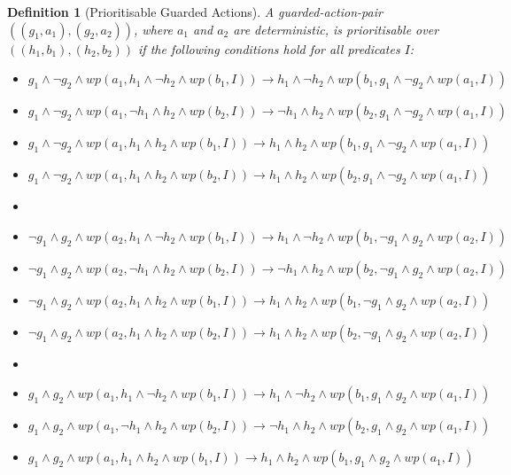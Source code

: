 \documentclass[11pt]{article}
\newtheorem{definition}{Definition}
\begin{document}
\begin{definition}[Prioritisable Guarded Actions]
A guarded-action-pair $((g_1,a_1),(g_2,a_2))$, where $a_1$ and $a_2$ are deterministic, is prioritisable over $((h_1,b_1),(h_2,b_2))$ if the following conditions hold for all predicates $I$:

\begin{itemize}
  \item $g_1 \land \lnot g_2 \land wp(a_1,h_1 \land \lnot h_2 \land wp(b_1,I)) \longrightarrow h_1 \land \lnot h_2 \land wp(b_1,g_1 \land \lnot g_2 \land wp(a_1,I))$
  \item $g_1 \land \lnot g_2 \land wp(a_1,\lnot h_1 \land h_2 \land wp(b_2,I)) \longrightarrow \lnot h_1 \land h_2 \land wp(b_2,g_1 \land \lnot g_2 \land wp(a_1,I))$
  \item $g_1 \land \lnot g_2 \land wp(a_1, h_1 \land h_2 \land wp(b_1,I)) \longrightarrow h_1 \land h_2 \land wp(b_1,g_1 \land \lnot g_2 \land wp(a_1,I))$
  \item $g_1 \land \lnot g_2 \land wp(a_1, h_1 \land h_2 \land wp(b_2,I)) \longrightarrow h_1 \land h_2 \land wp(b_2,g_1 \land \lnot g_2 \land wp(a_1,I))$
  \item[]
  \item $\lnot g_1 \land g_2 \land wp(a_2,h_1 \land \lnot h_2 \land wp(b_1,I)) \longrightarrow h_1 \land \lnot h_2 \land wp(b_1,\lnot g_1 \land g_2 \land wp(a_2,I))$ 
  \item $\lnot g_1 \land g_2 \land wp(a_2,\lnot h_1 \land h_2 \land wp(b_2,I)) \longrightarrow \lnot h_1 \land h_2 \land wp(b_2,\lnot g_1 \land g_2 \land wp(a_2,I))$
  \item $\lnot g_1 \land g_2 \land wp(a_2, h_1 \land h_2 \land wp(b_1,I)) \longrightarrow h_1 \land h_2 \land wp(b_1, \lnot g_1 \land g_2 \land wp(a_2,I))$
  \item $\lnot g_1 \land g_2 \land wp(a_2, h_1 \land h_2 \land wp(b_2,I)) \longrightarrow h_1 \land h_2 \land wp(b_2, \lnot g_1 \land g_2 \land wp(a_2,I))$
  \item[]
  \item $g_1 \land g_2 \land wp(a_1,h_1 \land \lnot h_2 \land wp(b_1,I)) \longrightarrow h_1 \land \lnot h_2 \land wp(b_1,g_1 \land g_2 \land wp(a_1,I))$
  \item $g_1 \land g_2 \land wp(a_1,\lnot h_1 \land h_2 \land wp(b_2,I)) \longrightarrow \lnot h_1 \land h_2 \land wp(b_2,g_1 \land g_2 \land wp(a_1,I))$
  \item $g_1 \land g_2 \land wp(a_1, h_1 \land h_2 \land wp(b_1,I)) \longrightarrow h_1 \land h_2 \land wp(b_1,g_1 \land g_2 \land wp(a_1,I))$

\end{itemize}
\end{definition}
\end{document}
